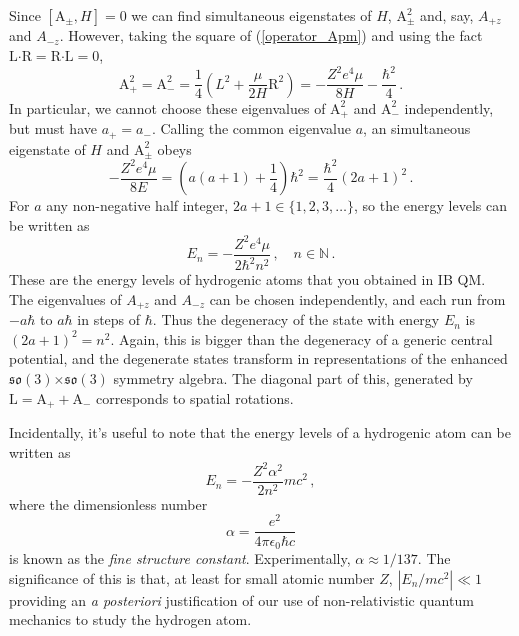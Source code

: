 \documentclass{article}
\theoremstyle{plain}\theoremheaderfont{\normalfont\itshape}\theorembodyfont{\rmfamily}\theoremseparator{.}\newtheorem*{rem}{Remark}\newtheorem*{ex}{Example}\newtheorem*{proof}{Proof}\newtheorem*{altp}{Alternative proof}
\theoremstyle{plain}\theoremheaderfont{\normalfont\bfseries}\theorembodyfont{\rmfamily}\theoremseparator{.}\newtheorem{thm}{Theorem}[section]\newtheorem{lem}[thm]{Lemma}\newtheorem{prop}[thm]{Proposition}\newtheorem*{cor}{Corollary}\newtheorem{defn}[thm]{Definition}\newtheorem{clm}[thm]{Claim}\newtheorem{clminproof}{Claim}
\theoremstyle{break}\theoremheaderfont{\normalfont\itshape}\theorembodyfont{\rmfamily}\theoremseparator{.\medskip}\newtheorem*{proofskip}{Proof}\newtheorem*{exs}{Examples}\newtheorem*{rems}{Remarks}
\theoremstyle{break}\theoremheaderfont{\normalfont\bfseries}\theorembodyfont{\rmfamily}\theoremseparator{.\medskip}\newtheorem{lemskip}[thm]{Lemma}\newtheorem{defnskip}[thm]{Definition}\newtheorem{propskip}[thm]{Proposition}\newtheorem{thmskip}[thm]{Theorem}
\numberwithin{equation}{section}
\newcommand{\vb}[1]{\bm{\mathrm{#1}}}
\newcommand{\cross}{\bm{\times}}
\newcommand{\vdot}{\bm{\cdot}}
\newcommand{\abs}[1]{\left| #1 \right|}
\newcommand{\NN}{\mathbb{N}}
\begin{document}
    Since \([\vb{A}_{\pm},H]=0\) we can find simultaneous eigenstates of \(H\), \(\vb{A}_{\pm}^{2}\) and, say, \(A_{+z}\) and \(A_{-z}\). However, taking the square of (\ref{operator_Apm}) and using the fact \(\vb{L}\vdot\vb{R}=\vb{R}\vdot\vb{L}=0\),
    \begin{equation}
        \vb{A}_+^2=\vb{A}_-^2=\frac{1}{4}\left(L^2+\frac{\mu}{2H}\vb{R}^2\right)=-\frac{Z^2 e^4\mu}{8H}-\frac{\hbar^2}{4}\,.
    \end{equation}
    In particular, we cannot choose these eigenvalues of \(\vb{A}_+^2\) and \(\vb{A}_-^2\) independently, but must have \(a_+=a_-\). Calling the common eigenvalue \(a\), an simultaneous eigenstate of \(H\) and \(\vb{A}_{\pm}^2\) obeys
    \begin{equation}
        -\frac{Z^2 e^4 \mu}{8E}=\left(a(a+1)+\frac{1}{4}\right)\hbar^2=\frac{\hbar^2}{4}(2a+1)^2\,.
    \end{equation} 
    For \(a\) any non-negative half integer, \(2a+1\in\{1,2,3,\dots\}\), so the energy levels can be written as
    \begin{equation}
        E_n=-\frac{Z^2 e^4\mu}{2\hbar^2 n^2}\,,\quad n\in\NN\,.
    \end{equation}
    These are the energy levels of hydrogenic atoms that you obtained in IB QM. The eigenvalues of \(A_{+z}\) and \(A_{-z}\) can be chosen independently, and each run from \(-a\hbar\) to \(a\hbar\) in steps of \(\hbar\). Thus the degeneracy of the state with energy \(E_n\) is \((2a+1)^2=n^2\). Again, this is bigger than the degeneracy of a generic central potential, and the degenerate states transform in representations of the enhanced \(\mathfrak{so}(3)\cross\mathfrak{so}(3)\) symmetry algebra. The diagonal part of this, generated by \(\vb{L}=\vb{A}_+ + \vb{A}_-\) corresponds to spatial rotations.

    Incidentally, it's useful to note that the energy levels of a hydrogenic atom can be written as
    \begin{equation}
        E_n=-\frac{Z^2\alpha^2}{2n^2}mc^2\,,
    \end{equation}
    where the dimensionless number
    \begin{equation}
        \alpha=\frac{e^2}{4\pi\epsilon_0 \hbar c}
    \end{equation}
    is known as the \textit{fine structure constant}. Experimentally, \(\alpha\approx 1/137\). The significance of this is that, at least for small atomic number \(Z\), \(\abs{E_n/mc^2}\ll 1\) providing an \textit{a posteriori} justification of our use of non-relativistic quantum mechanics to study the hydrogen atom.
\end{document}
